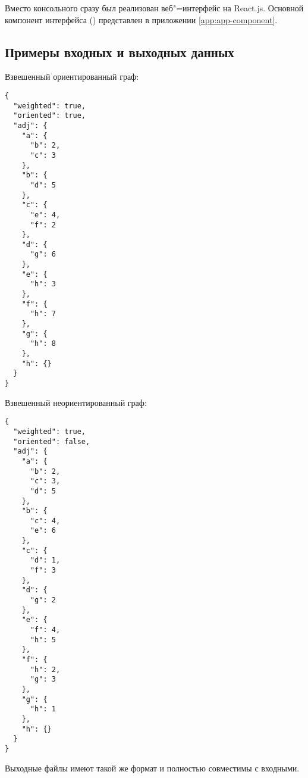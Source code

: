 Вместо консольного сразу был реализован веб"=интерфейс на React.js.
Основной компонент интерфейса () представлен в приложении
\ref{app:app-component}.

\subsection{Примеры входных и выходных данных}
Взвешенный ориентированный граф:
\begin{verbatim}
{
  "weighted": true,
  "oriented": true,
  "adj": {
    "a": {
      "b": 2,
      "c": 3
    },
    "b": {
      "d": 5
    },
    "c": {
      "e": 4,
      "f": 2
    },
    "d": {
      "g": 6
    },
    "e": {
      "h": 3
    },
    "f": {
      "h": 7
    },
    "g": {
      "h": 8
    },
    "h": {}
  }
}
\end{verbatim}

Взвешенный неориентированный граф:
\begin{verbatim}
{
  "weighted": true,
  "oriented": false,
  "adj": {
    "a": {
      "b": 2,
      "c": 3,
      "d": 5
    },
    "b": {
      "c": 4,
      "e": 6
    },
    "c": {
      "d": 1,
      "f": 3
    },
    "d": {
      "g": 2
    },
    "e": {
      "f": 4,
      "h": 5
    },
    "f": {
      "h": 2,
      "g": 3
    },
    "g": {
      "h": 1
    },
    "h": {}
  }
}
\end{verbatim}

Выходные файлы имеют такой же формат и полностью совместимы с входными.

